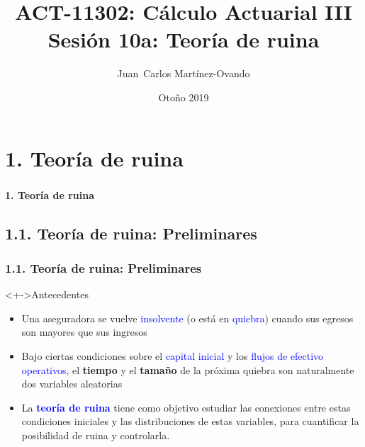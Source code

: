 \documentclass[cjk,t,compress]{beamer}
\title[C\'alculo Actuarial III]
{	ACT-11302: C\'alculo Actuarial III\\
	{\large Sesi\'on 10a: Teor\'ia de ruina}
}
\author[Mart\'inez-Ovando]{
{	\footnotesize
	\textcolor{MyDarkGreen}{Juan~Carlos Mart\'inez-Ovando}}
}
\institute[ITAM]
{	\textcolor{MyDarkGrey}{
	ITAM}
}
\date[ ] %
{	\scriptsize
	\textcolor{MyDarkGrey}{Oto\~no 2019}
}
\begin{document}
\sffamily
\begin{frame}[fragile]
	\frametitle{}
	\titlepage
\end{frame}


%
%
\section{1. Teor\'ia de ruina}
\begin{frame}[fragile]
	\frametitle{}
	\vspace{5.5cm}
	\begin{flushright}
		\textcolor{MyDarkBlue}{\Large \bf 1. Teor\'ia de ruina}
	\end{flushright}
\end{frame}

%
%
\subsection{1.1. Teor\'ia de ruina: Preliminares}
\begin{frame}[fragile]
	\frametitle{1.1. Teor\'ia de ruina: Preliminares}
	\scriptsize  	
		
		\vspace{0.1cm}
		\begin{block}<+->{Antecedentes}
		\vspace{0.1cm}
		\begin{itemize}
		  \item Una aseguradora se vuelve \textcolor{blue}{insolvente} (o est\'a en \textcolor{blue}{quiebra}) cuando sus egresos son mayores que sus ingresos
		  
		  \item Bajo ciertas condiciones sobre el \textcolor{blue}{capital inicial} y los \textcolor{blue}{flujos de efectivo operativos}, el {\bf tiempo} y el {\bf tama\~no} de la pr\'oxima quiebra son naturalmente dos variables aleatorias
		  
		  \item La \textcolor{blue}{\bf teor\'ia de ruina} tiene como objetivo estudiar las conexiones entre estas condiciones iniciales y las distribuciones de estas variables, para cuantificar la posibilidad de ruina y controlarla.
		\end{itemize}
		\end{block}

\end{frame}
\end{document}
